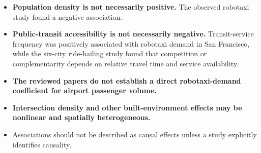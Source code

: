 \documentclass[10pt,a4paper]{article}
\providecommand{\tightlist}{\setlength{\itemsep}{0pt}\setlength{\parskip}{0pt}}
\begin{document}
\begin{itemize}
\tightlist
\item
  \textbf{Population density is not necessarily positive.} The observed robotaxi study found a negative association.
\item
  \textbf{Public-transit accessibility is not necessarily negative.} Transit-service frequency was positively associated with robotaxi demand in San Francisco, while the six-city ride-hailing study found that competition or complementarity depends on relative travel time and service availability.
\item
  \textbf{The reviewed papers do not establish a direct robotaxi-demand coefficient for airport passenger volume.}
\item
  \textbf{Intersection density and other built-environment effects may be nonlinear and spatially heterogeneous.}
\item
  Associations should not be described as causal effects unless a study explicitly identifies causality.
\end{itemize}
\end{document}
